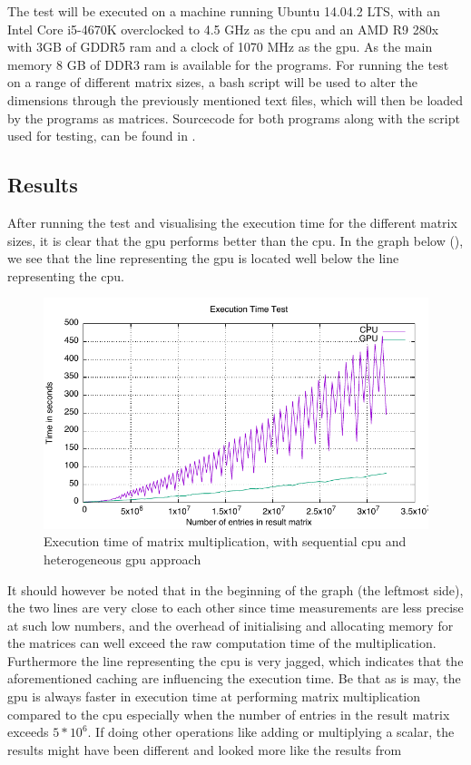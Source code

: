 The test will be executed on a machine running Ubuntu 14.04.2 LTS, with an Intel Core i5-4670K overclocked to 4.5 GHz as the \acrshort{cpu} and an AMD R9 280x with 3GB of GDDR5 ram and a clock of 1070 MHz as the \acrshort{gpu}.
As the main memory 8 GB of DDR3 ram is available for the programs.
For running the test on a range of different matrix sizes, a bash script will be used to alter the dimensions through the previously mentioned text files, which will then be loaded by the programs as matrices.
Sourcecode for both programs along with the script used for testing, can be found in .

\subsection{Results} %
\label{sub:results}
After running the test and visualising the execution time for the different matrix sizes, it is clear that the \acrshort{gpu} performs better than the \acrshort{cpu}.
In the graph below (), we see that the line representing the \acrshort{gpu} is located well below the line representing the \acrshort{cpu}.   
\begin{figure}[h!]
    \centering
    \includegraphics{figures/tests/graph.pdf}
    \caption{Execution time of matrix multiplication, with sequential \acrshort{cpu} and heterogeneous \acrshort{gpu} approach}\label{fig:test_results}
\end{figure} 
It should however be noted that in the beginning of the graph (the leftmost side), the two lines are very close to each other since time measurements are less precise at such low numbers, and the overhead of initialising and allocating memory for the matrices can well exceed the raw computation time of the multiplication.     
Furthermore the line representing the \acrshort{cpu} is very jagged, which indicates that the aforementioned caching are influencing the execution time.
Be that as is may, the \acrshort{gpu} is always faster in execution time at performing matrix multiplication compared to the \acrshort{cpu} especially when the number of entries in the result matrix exceeds $5*10^6$.
If doing other operations like adding or multiplying a scalar, the results might have been different and looked more like the results from 


